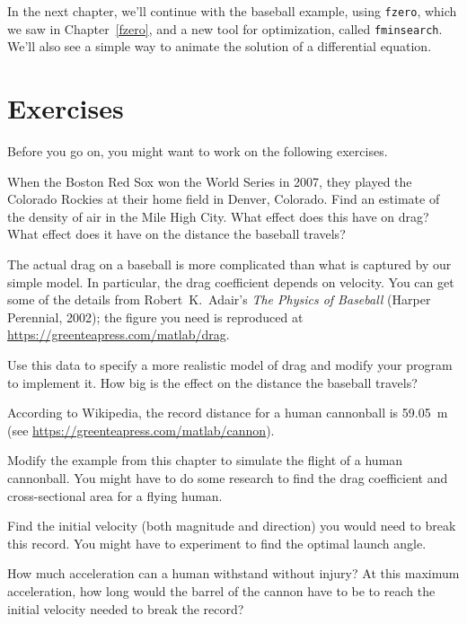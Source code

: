 In the next chapter, we'll continue with the baseball example, using \lstinline{fzero}, which we saw in Chapter~\ref{fzero}, and a new tool for optimization, called \lstinline{fminsearch}.  We'll also see a simple way to animate the solution of a differential equation.


\section{Exercises}

Before you go on, you might want to work on the following exercises.

\begin{ex}


When the Boston Red Sox won the World Series in 2007, they played the
Colorado Rockies at their home field in Denver, Colorado.  Find an
estimate of the density of air in the Mile High City.  What effect
does this have on drag?  What effect does it have on the distance the baseball travels?
\end{ex}


\begin{ex}


The actual drag on a baseball is more complicated than what is
captured by our simple model.  In particular, the drag coefficient
depends on velocity.  You can get some of the details from Robert~K.\ Adair's \emph{The
Physics of Baseball} (Harper Perennial, 2002); the figure you need is reproduced at \url{https://greenteapress.com/matlab/drag}.

Use this data to specify a more realistic model of drag and modify your
program to implement it.  How big is the effect on the distance the baseball travels?
\end{ex}


\begin{ex}
\label{cannon}


According to Wikipedia, the record distance for a human cannonball is \SI {59.05}{\meter} (see \url{https://greenteapress.com/matlab/cannon}).

Modify the example from this chapter to simulate the flight of a human cannonball.  You might have to do some research to find the drag coefficient and cross-sectional area for a flying human.

Find the initial velocity (both magnitude and direction) you would need to break this record.  You might have to experiment to find the optimal launch angle.

How much acceleration can a human withstand without injury?  At this maximum acceleration, how long would the barrel of the cannon have to be to reach the initial velocity needed to break the record?

\end{ex}
